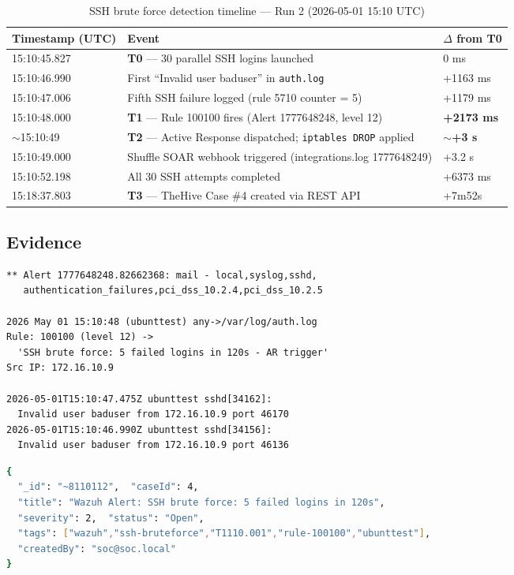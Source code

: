 \documentclass[12pt,a4paper]{report}
\begin{document}
\begin{table}[H]
\centering
\caption{SSH brute force detection timeline --- Run 2 (2026-05-01 15:10 UTC)}
\begin{tabularx}{\textwidth}{lXl}
\toprule
\textbf{Timestamp (UTC)} & \textbf{Event} & \textbf{$\Delta$ from T0} \\
\midrule
15:10:45.827 & \textbf{T0} --- 30 parallel SSH logins launched & 0 ms \\
15:10:46.990 & First ``Invalid user baduser'' in \texttt{auth.log} & +1163 ms \\
15:10:47.006 & Fifth SSH failure logged (rule 5710 counter = 5) & +1179 ms \\
15:10:48.000 & \textbf{T1} --- Rule 100100 fires (Alert 1777648248, level 12) & \textbf{+2173 ms} \\
$\sim$15:10:49 & \textbf{T2} --- Active Response dispatched; \texttt{iptables DROP} applied & \textbf{$\sim$+3 s} \\
15:10:49.000 & Shuffle SOAR webhook triggered (integrations.log 1777648249) & +3.2 s \\
15:10:52.198 & All 30 SSH attempts completed & +6373 ms \\
15:18:37.803 & \textbf{T3} --- TheHive Case \#4 created via REST API & +7m52s \\
\bottomrule
\end{tabularx}
\label{tab:timeline}
\end{table}

\subsection{Evidence}

\begin{lstlisting}[caption=Wazuh alerts.log --- Rule 100100 firing]
** Alert 1777648248.82662368: mail - local,syslog,sshd,
   authentication_failures,pci_dss_10.2.4,pci_dss_10.2.5

2026 May 01 15:10:48 (ubunttest) any->/var/log/auth.log
Rule: 100100 (level 12) ->
  'SSH brute force: 5 failed logins in 120s - AR trigger'
Src IP: 172.16.10.9

2026-05-01T15:10:47.475Z ubunttest sshd[34162]:
  Invalid user baduser from 172.16.10.9 port 46170
2026-05-01T15:10:46.990Z ubunttest sshd[34156]:
  Invalid user baduser from 172.16.10.9 port 46136
\end{lstlisting}

\begin{lstlisting}[language=bash, caption=TheHive Case \#4 API response]
{
  "_id": "~8110112",  "caseId": 4,
  "title": "Wazuh Alert: SSH brute force: 5 failed logins in 120s",
  "severity": 2,  "status": "Open",
  "tags": ["wazuh","ssh-bruteforce","T1110.001","rule-100100","ubunttest"],
  "createdBy": "soc@soc.local"
}
\end{lstlisting}
\end{document}
